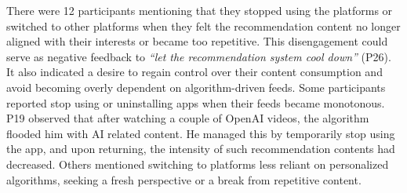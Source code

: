 There were 12 participants mentioning that they stopped using the platforms or switched to other platforms when they felt the recommendation content no longer aligned with their interests or became too repetitive. This disengagement could serve as negative feedback to \textit{``let the recommendation system cool down''} (P26). It also indicated a desire to regain control over their content consumption and avoid becoming overly dependent on algorithm-driven feeds. Some participants reported stop using or uninstalling apps when their feeds became monotonous. P19 observed that after watching a couple of OpenAI videos, the algorithm flooded him with AI related content. He managed this by temporarily stop using the app, and upon returning, the intensity of such recommendation contents had decreased. Others mentioned switching to platforms less reliant on personalized algorithms, seeking a fresh perspective or a break from repetitive content.

